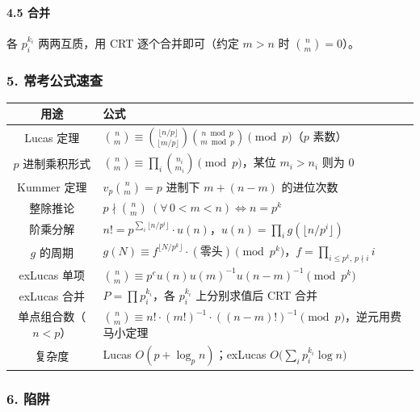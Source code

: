 \paragraph{4.5 合并}
各 $p_i^{k_i}$ 两两互质，用 CRT 逐个合并即可（约定 $m > n$ 时 $\binom{n}{m} = 0$）。

\hrulefill

\subsubsection*{5. 常考公式速查}

\begin{center}
\begin{tabular}{|c|p{10.2cm}|}
\hline
\textbf{用途} & \textbf{公式} \\
\hline
Lucas 定理 & $\binom{n}{m} \equiv \binom{\lfloor n/p \rfloor}{\lfloor m/p \rfloor}\binom{n \bmod p}{m \bmod p} \pmod p$（$p$ 素数）\\
\hline
$p$ 进制乘积形式 & $\binom{n}{m} \equiv \prod_i \binom{n_i}{m_i} \pmod p$，某位 $m_i > n_i$ 则为 $0$ \\
\hline
Kummer 定理 & $v_p\binom{n}{m} = p$ 进制下 $m + (n-m)$ 的进位次数 \\
\hline
整除推论 & $p \nmid \binom{n}{m}\ (\forall\,0<m<n) \iff n = p^k$ \\
\hline
阶乘分解 & $n! = p^{\sum_i \lfloor n/p^i \rfloor}\cdot u(n)$，$u(n) = \prod_i g(\lfloor n/p^i \rfloor)$ \\
\hline
$g$ 的周期 & $g(N) \equiv f^{\lfloor N/p^k \rfloor}\cdot(\text{零头}) \pmod{p^k}$，$f=\prod_{i \le p^k,\,p \nmid i} i$ \\
\hline
exLucas 单项 & $\binom{n}{m} \equiv p^e u(n)u(m)^{-1}u(n-m)^{-1} \pmod{p^k}$ \\
\hline
exLucas 合并 & $P = \prod p_i^{k_i}$，各 $p_i^{k_i}$ 上分别求值后 CRT 合并 \\
\hline
单点组合数（$n<p$） & $\binom{n}{m} \equiv n!\cdot(m!)^{-1}\cdot((n-m)!)^{-1} \pmod p$，逆元用费马小定理 \\
\hline
复杂度 & Lucas $O(p + \log_p n)$；exLucas $O\big(\sum_i p_i^{k_i}\log n\big)$ \\
\hline
\end{tabular}
\end{center}

\hrulefill

\subsubsection*{6. 陷阱}

